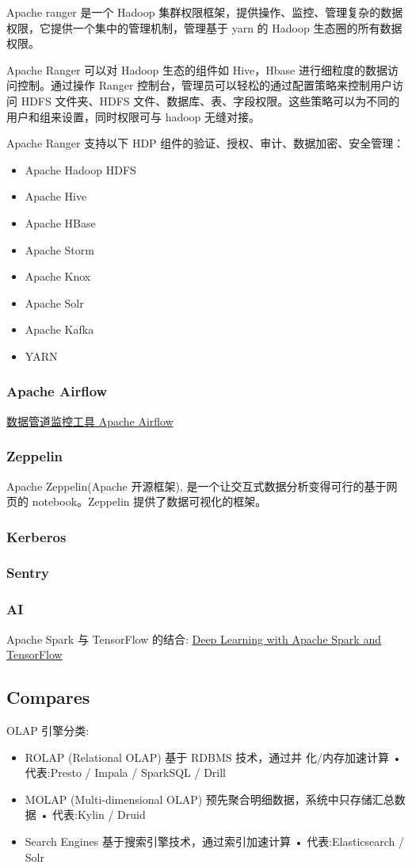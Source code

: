 \documentclass[hyperref, UTF-8]{ctexart}
\begin{document}
Apache ranger 是一个 Hadoop 集群权限框架，提供操作、监控、管理复杂的数据权限，它提供一个集中的管理机制，管理基于 yarn 的 Hadoop 生态圈的所有数据权限。   

Apache Ranger 可以对 Hadoop 生态的组件如 Hive，Hbase 进行细粒度的数据访问控制。通过操作 Ranger 控制台，管理员可以轻松的通过配置策略来控制用户访问 HDFS 文件夹、HDFS 文件、数据库、表、字段权限。这些策略可以为不同的用户和组来设置，同时权限可与 hadoop 无缝对接。   

Apache Ranger 支持以下 HDP 组件的验证、授权、审计、数据加密、安全管理：
\begin{itemize}
\item Apache Hadoop HDFS
\item Apache Hive
\item Apache HBase
\item Apache Storm
\item Apache Knox
\item Apache Solr
\item Apache Kafka
\item YARN
\end{itemize}
\subsubsection{Apache Airflow}
\label{sec:org145e017}
\href{https://oschina.net/p/airflow}{数据管道监控工具 Apache Airflow}
\subsubsection{Zeppelin}
\label{sec:org6160717}
Apache Zeppelin(Apache 开源框架), 是一个让交互式数据分析变得可行的基于网页的 notebook。Zeppelin 提供了数据可视化的框架。
\subsubsection{Kerberos}
\label{sec:org94d0d88}
\subsubsection{Sentry}
\label{sec:org1980f27}
\subsubsection{AI}
\label{sec:orgdf6682a}
Apache Spark 与 TensorFlow 的结合: \href{https://databricks.com/blog/2016/01/25/deep-learning-with-apache-spark-and-tensorflow.html}{Deep Learning with Apache Spark and TensorFlow}
\subsection{Compares}
\label{sec:orgf19f7e8}
OLAP 引擎分类:
\begin{itemize}
\item ROLAP (Relational OLAP)
基于 RDBMS 技术，通过并 化/内存加速计算 • 代表:Presto / Impala / SparkSQL / Drill
\item MOLAP (Multi-dimensional OLAP)
预先聚合明细数据，系统中只存储汇总数据 • 代表:Kylin / Druid
\item Search Engines
基于搜索引擎技术，通过索引加速计算 • 代表:Elasticsearch / Solr
\end{itemize}
\end{document}
